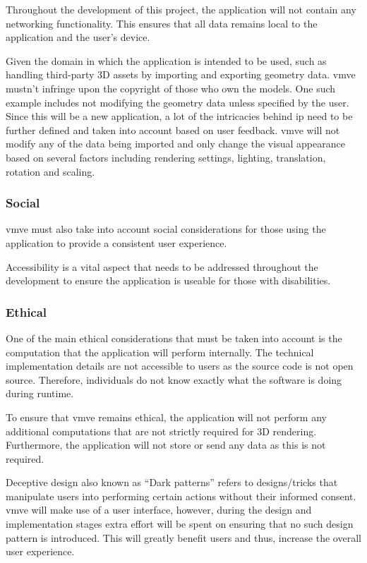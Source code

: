 \documentclass[11pt]{article}
\begin{document}
Throughout the development of this project, the application will not contain any
networking functionality. This ensures that all data remains local to the
application and the user's device.

Given the domain in which the application is intended to be used, such as
handling third-party 3D assets by importing and exporting geometry data.
\gls*{vmve} mustn't infringe upon the copyright of those who own the models. One
such example includes not modifying the geometry data unless specified by the
user. Since this will be a new application, a lot of the intricacies behind
\gls*{ip} need to be further defined and taken into account based on user
feedback. \gls*{vmve} will not modify any of the data being imported and only
change the visual appearance based on several factors including rendering
settings, lighting, translation, rotation and scaling. 

\subsubsection{Social}
\gls*{vmve} must also take into account social considerations for those using the
application to provide a consistent user experience.

Accessibility is a vital aspect that needs to be addressed throughout the
development to ensure the application is useable for those with disabilities.

\subsubsection{Ethical}
One of the main ethical considerations that must be taken into account is the
computation that the application will perform internally. The technical
implementation details are not accessible to users as the source code is not
open source. Therefore, individuals do not know exactly what the software is
doing during runtime.

To ensure that \gls*{vmve} remains ethical, the application will not perform any
additional computations that are not strictly required for 3D rendering.
Furthermore, the application will not store or send any data as this is not
required.

Deceptive design also known as ``Dark patterns'' refers to designs/tricks that
manipulate users into performing certain actions without their informed consent.
\gls*{vmve} will make use of a user interface, however, during the design and
implementation stages extra effort will be spent on ensuring that no such design
pattern is introduced. This will greatly benefit users and thus, increase the
overall user experience.
\end{document}
